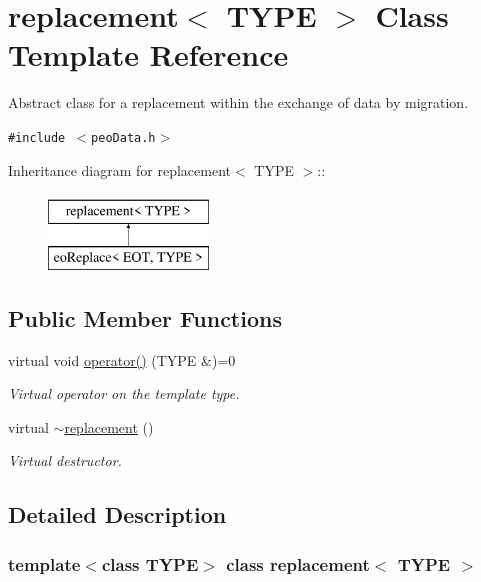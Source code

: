 \hypertarget{classreplacement}{
\section{replacement$<$ TYPE $>$ Class Template Reference}
\label{classreplacement}
}
Abstract class for a replacement within the exchange of data by migration.  


{\tt \#include $<$peo\-Data.h$>$}

Inheritance diagram for replacement$<$ TYPE $>$::\begin{figure}[H]
\begin{center}
\leavevmode
\includegraphics[height=2cm]{classreplacement}
\end{center}
\end{figure}
\subsection*{Public Member Functions}
\begin{CompactItemize}
\item 
virtual void \hyperlink{classreplacement_2c21feaad602bb9d691f0081ac4363b1}{operator()} (TYPE \&)=0
\begin{CompactList}\small\item\em Virtual operator on the template type. \item\end{CompactList}\item 
\hypertarget{classreplacement_82d1187b7f19a7bb4f251e3774f7fb88}{
virtual \hyperlink{classreplacement_82d1187b7f19a7bb4f251e3774f7fb88}{$\sim$replacement} ()}
\label{classreplacement_82d1187b7f19a7bb4f251e3774f7fb88}

\begin{CompactList}\small\item\em Virtual destructor. \item\end{CompactList}\end{CompactItemize}


\subsection{Detailed Description}
\subsubsection*{template$<$class TYPE$>$ class replacement$<$ TYPE $>$}

